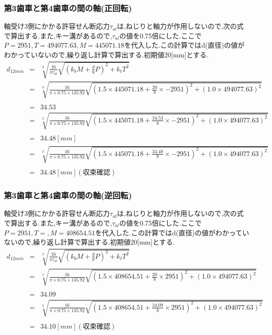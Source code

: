 \subsubsection{第3歯車と第4歯車の間の軸(正回転)}
軸受け3側にかかる許容せん断応力$\tau_{al}$は,ねじりと軸力が作用しないので,次の式で算出する.また,キー溝があるので,$\tau_{al}$の値を0.75倍にした.ここで$P=2951,T=494077.63, M=445071.18$を代入した.この計算ではd(直径)の値がわかっていないので,繰り返し計算で算出する.初期値20[mm]とする.
\begin{eqnarray}
d_{12min}&=& \sqrt [3]{ \frac{16}{\pi \tau_{al}}\sqrt{(k_bM+\frac{d}{8}P)^2+k_tT^2} }\\
       &=& \sqrt [3]{ \frac{16}{\pi \times 0.75 \times 135.92} \sqrt{(1.5 \times 445071.18 +\frac{20}{8}\times -2951)^2+(1.0 \times 494077.63)^2} }\nonumber\\
\\
       &=&34.53\\
       &=& \sqrt [3]{ \frac{16}{\pi \times 0.75 \times 135.92} \sqrt{(1.5 \times 445071.18 +\frac{34.53}{8}\times -2951)^2+(1.0 \times 494077.63)^2} }\nonumber\\
\\
         &=& 34.48[mm]\\
       &=& \sqrt [3]{ \frac{16}{\pi \times 0.75 \times 135.92} \sqrt{(1.5 \times 445071.18 +\frac{34.48}{8}\times -2951)^2+(1.0 \times 494077.63)^2} }\nonumber\\
\\
         &=& 34.48[mm](収束確認)
\end{eqnarray}
\subsubsection{第3歯車と第4歯車の間の軸(逆回転)}
軸受け3側にかかる許容せん断応力$\tau_{al}$は,ねじりと軸力が作用しないので,次の式で算出する.また,キー溝があるので,$\tau_{al}$の値を0.75倍にした.ここで$P=2951,T=, M=408654.51$を代入した.この計算ではd(直径)の値がわかっていないので,繰り返し計算で算出する.初期値20[mm]とする.
\begin{eqnarray}
d_{12min}&=& \sqrt [3]{ \frac{16}{\pi \tau_{al}}\sqrt{(k_bM+\frac{d}{8}P)^2+k_tT^2} }\\
       &=& \sqrt [3]{ \frac{16}{\pi \times 0.75 \times 135.92} \sqrt{(1.5 \times 408654.51 +\frac{20}{8}\times 2951)^2+(1.0 \times 494077.63)^2} }\nonumber\\
\\
       &=&34.09\\
       &=& \sqrt [3]{ \frac{16}{\pi \times 0.75 \times 135.92} \sqrt{(1.5 \times 408654.51 +\frac{34.09}{8}\times 2951)^2+(1.0 \times 494077.63)^2} }\nonumber\\
\\
         &=& 34.10[mm](収束確認)
\end{eqnarray}
